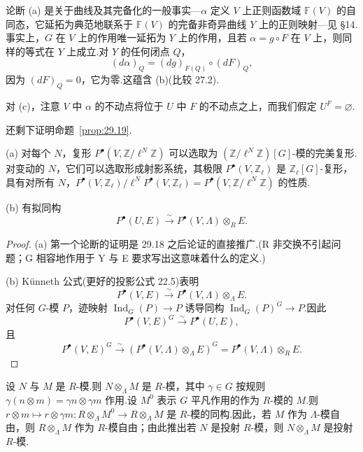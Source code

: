 论断 (a) 是关于曲线及其完备化的一般事实---$\alpha$ 定义 $V$ 上正则函数域 $\mathbb{F}(V)$ 的自同态，它延拓为典范地联系于 $\mathbb{F}(V)$ 的完备非奇异曲线 $Y$ 上的正则映射---见 \S 14.事实上，$G$ 在 $V$ 上的作用唯一延拓为 $Y$ 上的作用，且若 $\alpha = g \circ F$ 在 $V$ 上，则同样的等式在 $Y$ 上成立.对 $Y$ 的任何闭点 $Q$，
\[
(d\alpha)_Q = (dg)_{F(Q)} \circ (dF)_Q,
\]
因为 $(dF)_Q = 0$，它为零.这蕴含 (b)(比较 27.2).

对 (c)，注意 $V$ 中 $\alpha$ 的不动点将位于 $U$ 中 $F$ 的不动点之上，而我们假定 $U^{F} = \varnothing$.

还剩下证明命题~\ref{prop:29.19}.

\begin{proposition}\label{prop:29.20}
(a) 对每个 $N$，复形 $P^{\bullet}(V, \mathbb{Z}/\ell^{N}\mathbb{Z})$ 可以选取为 $(\mathbb{Z}/\ell^{N}\mathbb{Z})[G]$-模的完美复形.对变动的 $N$，它们可以选取形成射影系统，其极限 $P^{\bullet}(V, \mathbb{Z}_{\ell})$ 是 $\mathbb{Z}_{\ell}[G]$-复形，具有对所有 $N$，$P^{\bullet}(V, \mathbb{Z}_{\ell})/\ell^{N}P^{\bullet}(V, \mathbb{Z}_{\ell}) = P^{\bullet}(V, \mathbb{Z}/\ell^{N}\mathbb{Z})$ 的性质.

(b) 有拟同构
\[
P^{\bullet}(U, E) \xrightarrow{\sim} P^{\bullet}(V, \Lambda) \otimes_{R} E.
\]
\end{proposition}

\begin{proof}
(a) 第一个论断的证明是 29.18 之后论证的直接推广.(R 非交换不引起问题；G 相容地作用于 Y 与 E 要求写出这意味着什么的定义.)

(b) K\"unneth 公式(更好的投影公式 22.5)表明
\[
P^{\bullet}(V, E) \xrightarrow{\sim} P^{\bullet}(V, \Lambda) \otimes_{\Lambda} E.
\]
对任何 $G$-模 $P$，迹映射 $\operatorname{Ind}_G(P) \to P$ 诱导同构 $\operatorname{Ind}_G(P)^{G} \to P$.因此
\[
P^{\bullet}(V, E)^{G} \xrightarrow{\sim} P^{\bullet}(U, E),
\]
且
\[
P^{\bullet}(V, E)^{G} \xrightarrow{\sim} (P^{\bullet}(V, \Lambda) \otimes_{\Lambda} E)^{G} = P^{\bullet}(V, \Lambda) \otimes_{R} E.
\]
\end{proof}

\begin{remark}\label{rem:29.21}
设 $N$ 与 $M$ 是 $R$-模.则 $N \otimes_{\Lambda} M$ 是 $R$-模，其中 $\gamma \in G$ 按规则 $\gamma(n \otimes m) = \gamma n \otimes \gamma m$ 作用.设 $M^{0}$ 表示 $G$ 平凡作用的作为 $R$-模的 $M$.则 $r \otimes m \mapsto r \otimes \gamma m \colon R \otimes_{\Lambda} M^{0} \to R \otimes_{\Lambda} M$ 是 $R$-模的同构.因此，若 $M$ 作为 $\Lambda$-模自由，则 $R \otimes_{\Lambda} M$ 作为 $R$-模自由；由此推出若 $N$ 是投射 $R$-模，则 $N \otimes_{\Lambda} M$ 是投射 $R$-模.
\end{remark}

